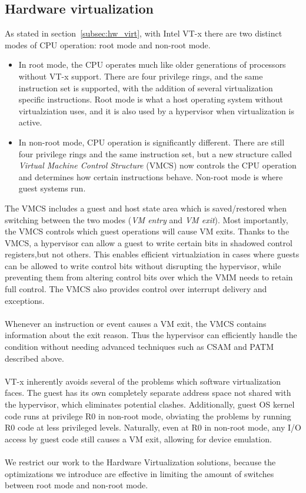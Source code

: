 \documentclass[a4paper, 12pt, titlepage]{report}
\begin{document}
\subsection{Hardware virtualization}
As stated in section~\ref{subsec:hw_virt}, with Intel VT-x there are two distinct modes of CPU operation: root mode and non-root mode.
\begin{itemize}
\item In root mode, the CPU operates much like older generations of processors without VT-x support. There are four privilege rings, and the same instruction set is supported, with the addition of several virtualization specific instructions. Root mode is what a host operating system without virtualziation uses, and it is also used by a hypervisor when virtualization is active.
\item In non-root mode, CPU operation is significantly different. There are still four privilege rings and the same instruction set, but a new structure called \textit{Virtual Machine Control Structure} (VMCS) now controls the CPU operation and determines how certain instructions behave. Non-root mode is where guest systems run.
\end{itemize}
The VMCS includes a guest and host state area which is saved/restored when switching between the two modes (\textit{VM entry} and \textit{VM exit}). Most importantly, the VMCS controls which guest operations will cause VM exits.
Thanks to the VMCS, a hypervisor can allow a guest to write certain bits in shadowed control registers,but not others. This enables efficient virtualziation in cases where guests can be allowed to write control bits without disrupting the hypervisor, while preventing them from altering control bits over which the VMM needs to retain full control. The VMCS also provides control over interrupt delivery and exceptions.
\\
\\
Whenever an instruction or event causes a VM exit, the VMCS contains information about the exit reason. Thus the hypervisor can efficiently handle the condition without needing advanced techniques such as CSAM and PATM described above.
\\
\\
VT-x inherently avoids several of the problems which software virtualization faces. The guest has its own completely separate address space not shared with the hypervisor, which eliminates potential clashes. Additionally, guest OS kernel code runs at privilege R0 in non-root mode, obviating the problems by running R0 code at less privileged levels. Naturally, even at R0 in non-root mode, any I/O access by guest code still causes a VM exit, allowing for device emulation.
\\
\\
We restrict our work to the Hardware Virtualization solutions, because the optimizations we introduce are effective in limiting the amount of switches between root mode and non-root mode.
\end{document}
